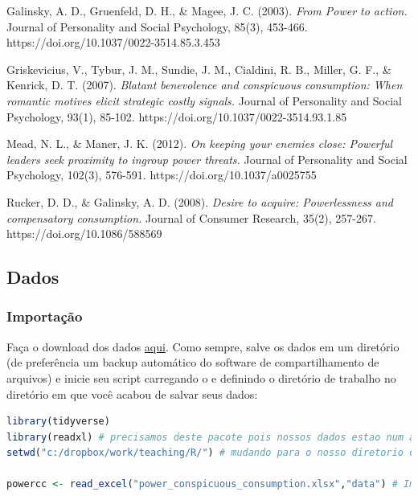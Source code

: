 \documentclass{article}
\begin{document}
\vspace{.25cm}
\hspace{-.5cm}Galinsky, A. D., Gruenfeld, D. H., & Magee, J. C. (2003). \textit{From Power to action.} Journal of Personality and Social Psychology, 85(3), 453-466. https://doi.org/10.1037/0022-3514.85.3.453

\vspace{.25cm}
\hspace{-.5cm}Griskevicius, V., Tybur, J. M., Sundie, J. M., Cialdini, R. B., Miller, G. F., & Kenrick, D. T. (2007). \textit{Blatant benevolence and conspicuous consumption: When romantic motives elicit strategic costly signals.} Journal of Personality and Social Psychology, 93(1), 85-102. https://doi.org/10.1037/0022-3514.93.1.85

\vspace{.25cm}
\hspace{-.5cm}Mead, N. L., & Maner, J. K. (2012). \textit{On keeping your enemies close: Powerful leaders seek proximity to ingroup power threats.} Journal of Personality and Social Psychology, 102(3), 576-591. https://doi.org/10.1037/a0025755

\vspace{.25cm}
\hspace{-.5cm}Rucker, D. D., & Galinsky, A. D. (2008). \textit{Desire to acquire: Powerlessness and compensatory consumption.} Journal of Consumer Research, 35(2), 257-267. https://doi.org/10.1086/588569

\newpage

\subsection{Dados}
\subsubsection{Importação}

Faça o download dos dados \href{http://users.telenet.be/samuelfranssens/tutorial_data/power_conspicuous_consumption.xlsx}{aqui}. Como sempre, salve os dados em um diretório (de preferência um backup automático do software de compartilhamento de arquivos) e inicie seu script carregando o  e definindo o diretório de trabalho no diretório em que você acabou de salvar seus dados:

\begin{lstlisting}[language=R]
library(tidyverse)
library(readxl) # precisamos deste pacote pois nossos dados estao num arquivo Excel
setwd("c:/dropbox/work/teaching/R/") # mudando para o nosso diretorio de trabalho

powercc <- read_excel("power_conspicuous_consumption.xlsx","data") # Importe o arquivo Excel. Perceba que o nome da aba do Excel eh data
\end{lstlisting}
\end{document}
